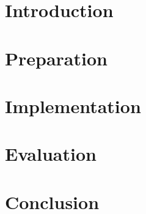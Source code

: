 \documentclass[12pt,twoside,notitlepage]{report}
\begin{document}
\setcounter{page}{1}
\pagestyle{headings}

\chapter{Introduction}


\chapter{Preparation}


\chapter{Implementation}


\chapter{Evaluation}


\chapter{Conclusion}




\cleardoublepage

\end{document}
